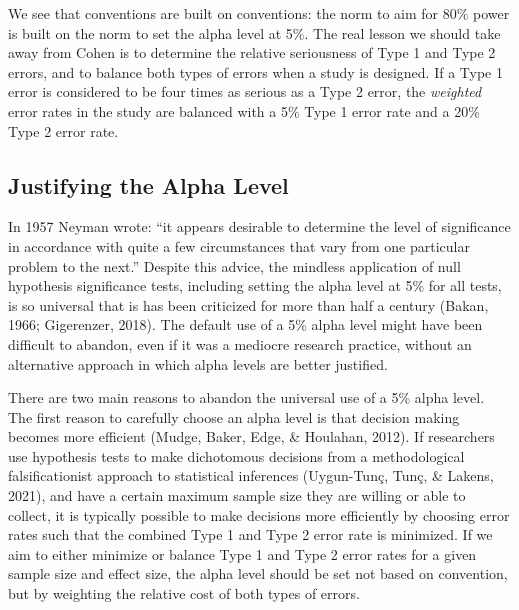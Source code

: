 \documentclass[
  english,
  ,man, a4paper,floatsintext]{apa6}
\begin{document}
We see that conventions are built on conventions: the norm to aim for 80\% power is built on the norm to set the alpha level at 5\%. The real lesson we should take away from Cohen is to determine the relative seriousness of Type 1 and Type 2 errors, and to balance both types of errors when a study is designed. If a Type 1 error is considered to be four times as serious as a Type 2 error, the \emph{weighted} error rates in the study are balanced with a 5\% Type 1 error rate and a 20\% Type 2 error rate.

\hypertarget{justifying-the-alpha-level}{%
\subsection{Justifying the Alpha Level}\label{justifying-the-alpha-level}}

In 1957 Neyman wrote: ``it appears desirable to determine the level of significance in accordance with quite a few circumstances that vary from one particular problem to the next.'' Despite this advice, the mindless application of null hypothesis significance tests, including setting the alpha level at 5\% for all tests, is so universal that is has been criticized for more than half a century (Bakan, 1966; Gigerenzer, 2018). The default use of a 5\% alpha level might have been difficult to abandon, even if it was a mediocre research practice, without an alternative approach in which alpha levels are better justified.

There are two main reasons to abandon the universal use of a 5\% alpha level. The first reason to carefully choose an alpha level is that decision making becomes more efficient (Mudge, Baker, Edge, \& Houlahan, 2012). If researchers use hypothesis tests to make dichotomous decisions from a methodological falsificationist approach to statistical inferences (Uygun-Tunç, Tunç, \& Lakens, 2021), and have a certain maximum sample size they are willing or able to collect, it is typically possible to make decisions more efficiently by choosing error rates such that the combined Type 1 and Type 2 error rate is minimized. If we aim to either minimize or balance Type 1 and Type 2 error rates for a given sample size and effect size, the alpha level should be set not based on convention, but by weighting the relative cost of both types of errors.
\end{document}

